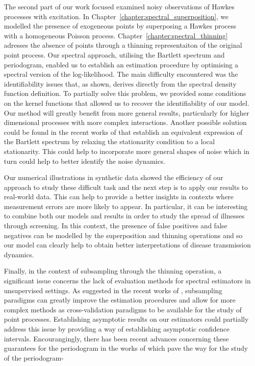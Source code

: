 \vspace{5mm}

The second part of our work focused examined noisy observations of Hawkes processes with excitation. 
In Chapter~\ref{chapter:spectral_superposition}, we modelled the presence of exogeneous points by superposing a Hawkes process with a homogeneous Poisson process.
Chapter~\ref{chapter:spectral_thinning} adresses the absence of points through a thinning representaiton of the original point process.
Our spectral approach, utilising the Bartlett spectrum and periodogram, enabled us to establish an estimation procedure by optimising a spectral version of the log-likelihood.
The main difficulty encountered was the identifiability issues that, as shown, derives directly from the spectral density function definition.
To partially solve this problem, we provided some conditions on the kernel functions that allowed us to recover the identifiability of our model.
Our method will greatly benefit from more general results, particularly for higher dimensional processes with more complex interactions.
Another possible solution could be found in the recent works of \textcite{Roueff2019} that establish an equivalent expression of the Bartlett spectrum by relaxing the stationarity condition to a local stationarity. 
This could help to incorporate more general shapes of noise which in turn could help to better identify the noise dynamics.

Our numerical illustrations in synthetic data showed the efficiency of our approach to study these difficult task and the next step is to apply our results to real-world data.
This can help to provide a better insights in contexts where measurement errors are more likely to appear.
In particular, it can be interesting to combine both our models and results in order to study the spread of illnesses through screening.
In this context, the presence of false positives and false negatives can be modelled by the superposition and thinning operations and so our model can clearly help to obtain better interpretations of disease transmission dynamics.

Finally, in the context of subsampling through the thinning operation, a significant issue concerns the lack of evaluation methods for spectral estimators in unsupervised settings.
As suggested in the recent works of \textcite{Cronie2024, Coeurjolly2024}, subsampling paradigms can greatly improve the estimation procedures and allow for more complex methods as cross-validation paradigms to be available for the study of point processes. 
Establishing asymptotic results on our estimators could partially address this issue by providing a way of establishing asymptotic confidence intervals. Encourangingly, there has been recent advances concerning these guarantees for the periodogram in the works of \textcite{Rajala2023, Yang2024} which pave the way for the study of the periodogram-

